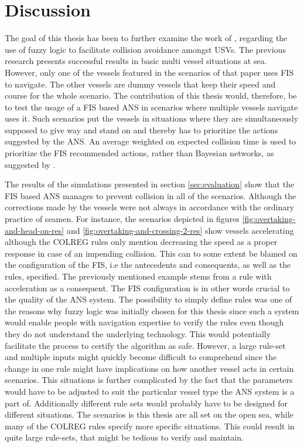 \chapter{Discussion}%
\label{chap:disc}
The goal of this thesis has been to further examine the work of \textcite{perera2012intelligent}, regarding the use of fuzzy logic to facilitate collision avoidance amongst USVs. The previous research presents successful results in
basic multi vessel situations at sea. However, only one of the vessels featured in the scenarios of that paper uses FIS to navigate. The other vessels
are dummy vessels that keep their speed and course for the whole scenario.
The contribution of this thesis would, therefore, be to test the usage of a FIS
based ANS in scenarios where multiple vessels navigate uses it. Such scenarios put the vessels in situations where they are simultaneously supposed to give way and stand on and thereby has to prioritize the actions suggested by the ANS. An average weighted on expected collision time is used to prioritize the FIS recommended actions, rather
than Bayesian networks, as suggested by \textcite{perera2012intelligent}.

The results of the simulations presented in section \ref{sec:evaluation} show that the FIS based ANS manages to prevent collision in all of the scenarios. Although the corrections made by the vessels were not always in accordance with the ordinary practice of seamen. For instance, the scenarios depicted in figures \ref{fig:overtaking-and-head-on-res} and \ref{fig:overtaking-and-crossing-2-res} show vessels accelerating although the COLREG rules only mention decreasing the speed as a proper response in case of an impending collision. This can to some extent be blamed on the configuration of the FIS, i.e the  antecedents and consequents, as well as the rules, specified. The previously mentioned example stems from a rule with acceleration as a consequent.  The FIS configuration is in other words crucial to the quality of the ANS system. The possibility to simply define rules was one of the reasons why fuzzy logic was initially chosen for this thesis since such a system would enable people with navigation expertise to verify the rules even though they do not understand the underlying technology. This would potentially facilitate the process to certify the algorithm as safe. However, a large rule-set  and multiple inputs might quickly become difficult to comprehend since the change in one rule might have implications on how another vessel acts in  certain scenarios. This situations is further complicated by the fact that the parameters would have to be adjusted to suit the particular vessel type the ANS system is a part of. Additionally different rule sets would probably have to be designed for different situations. The scenarios is this thesis are all set on the open sea, while many of the COLREG rules specify more specific situations. This could result in quite large rule-sets, that might be tedious to verify and maintain.

